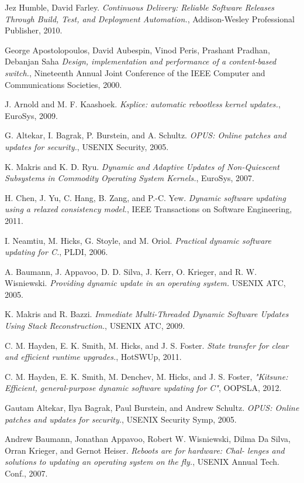 \documentclass[a4paper,11pt,twoside]{report}
\begin{document}
\begin{thebibliography}{1}
    Jez Humble, David Farley. {\em Continuous Delivery: Reliable Software Releases Through Build, Test, and Deployment Automation.}, Addison-Wesley Professional Publisher, 2010.     
   
     George Apostolopoulos, David Aubespin, Vinod Peris, Prashant Pradhan, Debanjan Saha {\em Design, implementation and performance of a content-based switch.}, Nineteenth Annual Joint Conference of the IEEE Computer and Communications Societies, 2000.
   
   J. Arnold and M. F. Kaashoek. {\em Ksplice: automatic rebootless kernel updates.}, EuroSys, 2009.
  
    G. Altekar, I. Bagrak, P. Burstein, and A. Schultz. {\em OPUS: Online patches and updates for security.}, USENIX Security, 2005.


   K. Makris and K. D. Ryu. {\em Dynamic and Adaptive Updates of Non-Quiescent Subsystems in Commodity Operating System Kernels.}, EuroSys, 2007. 
  
   H. Chen, J. Yu, C. Hang, B. Zang, and P.-C. Yew. {\em Dynamic software updating using a relaxed consistency model.}, IEEE Transactions on Software Engineering, 2011.

   I. Neamtiu, M. Hicks, G. Stoyle, and M. Oriol. {\em Practical dynamic software updating for C.}, PLDI, 2006.
  
   A. Baumann, J. Appavoo, D. D. Silva, J. Kerr, O. Krieger, and R. W. Wisniewski. {\em Providing dynamic update in an operating system.} USENIX ATC, 2005. 

   K. Makris and R. Bazzi. {\em Immediate Multi-Threaded Dynamic Software Updates Using Stack Reconstruction.}, USENIX ATC, 2009.

  C. M. Hayden, E. K. Smith, M. Hicks, and J. S. Foster. {\em State transfer for clear and efficient runtime upgrades.}, HotSWUp, 2011.
 
   C. M. Hayden, E. K. Smith, M. Denchev, M. Hicks, and J. S. Foster, {\em "Kitsune: Efficient, general-purpose dynamic software updating for C"}, OOPSLA, 2012.
  
   Gautam Altekar, Ilya Bagrak, Paul Burstein, and Andrew Schultz. {\em OPUS: Online patches and updates for security.}, USENIX Security Symp, 2005. 

   Andrew Baumann, Jonathan Appavoo, Robert W. Wisniewski, Dilma Da Silva, Orran Krieger, and Gernot Heiser. {\em Reboots are for hardware: Chal- lenges and solutions to updating an operating system on the fly.}, USENIX Annual Tech. Conf., 2007. 
  

\end{thebibliography}
\end{document}
